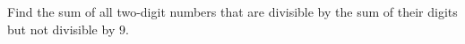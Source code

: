 Find the sum of all two-digit numbers that are divisible by the sum of their digits but not divisible by $9$.
